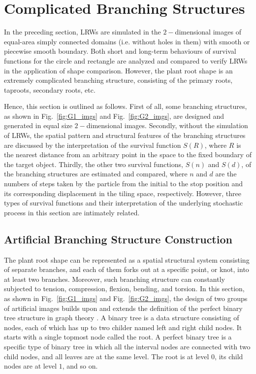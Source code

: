 \section{Complicated Branching Structures}\label{section:branching_structures}


In the preceding section, LRWs are simulated in the $2-$dimensional
images of equal-area simply connected domains (i.e. without holes in
them) with smooth or piecewise smooth boundary. Both short and
long-term behaviours of survival functions for the circle and
rectangle are analyzed and compared to verify LRWs in the application
of shape comparison. However, the plant root shape is an extremely
complicated branching structure, consisting of the primary roots,
taproots, secondary roots, etc. 

Hence, this section is outlined as follows. First of all, some
branching structures, as shown in Fig.~\ref{fig:G1_imgs} and
Fig.~\ref{fig:G2_imgs}, are designed and generated in equal size
$2-$dimensional images. Secondly, without the simulation of LRWs, the
spatial pattern and structural features of the branching structures
are discussed by the interpretation of the survival function $S(R)$,
where $R$ is the nearest distance from an arbitrary point in the space
to the fixed boundary of the target object. Thirdly, the other two
survival functions, $S(n)$ and $S(d)$, of the branching structures are
estimated and compared, where $n$ and $d$ are the numbers of steps
taken by the particle from the initial to the stop position and its
corresponding displacement in the tiling space, respectively. However,
three types of survival functions and their interpretation of the
underlying stochastic process in this section are intimately related.



\subsection{Artificial Branching Structure Construction}


The plant root shape can be represented as a spatial structural system
consisting of separate branches, and each of them forks out at a
specific point, or knot, into at least two branches.  Moreover, such
branching structure can constantly subjected to tension, compression,
flexion, bending, and torsion.  In this section, as shown in
Fig.~\ref{fig:G1_imgs} and Fig.~\ref{fig:G2_imgs}, the design of two
groups of artificial images builds upon and extends the definition of
the perfect binary tree structure \cite{rosen1999discrete} in graph
theory \cite{west2001introduction}. A binary tree is a data structure
consisting of nodes, each of which has up to two childer named left
and right child nodes. It starts with a single topmost node called the
root. A perfect binary tree is a specific type of binary tree in which
all the interval nodes are connected with two child nodes, and all
leaves are at the same level. The root is at level $0$, its child
nodes are at level $1$, and so on.



